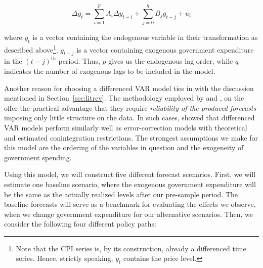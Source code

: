 \begin{equation}
\Delta y_{t}= \sum^{p}_{i = 1}A_{i}\Delta y_{t-i} + \sum^{q}_{j=0}B_{j}g_{t-j} + u_{t}
\end{equation}

where $y_{t}$ is a vector containing the endogenous variable in their transformation as described above\footnote{Note that the CPI series is, by its construction, already a differenced time series. Hence, strictly speaking,  $y_{t}$ contains the price level.}, $g_{t-j}$ is a vector containing exogenous government expenditure in the $(t-j)^{\text{th}}$ period. Thus, $p$ gives us the endogenous lag order, while $q$ indicates the number of exogenous lags to be included in the model. 

Another reason for choosing a differenced VAR model ties in with the discussion mentioned in Section~\ref{sec:litrev}. The methodology employed by \citeauthor{lenza2010} and \citeauthor{kapetanios2012}, on the offer the practical advantage that they require \emph{reliability of the produced forecasts} imposing only little structure on the data. In such cases, \citeauthor{duy1998modeling} showed that differenced VAR models perform similarly well as error-correction models with theoretical and estimated conintegration restrictions. The strongest assumptions we make for this model are the ordering of the variables in question and the exogeneity of government spending.

Using this model, we will construct five different forecast scenarios. First, we will estimate one baseline scenario, where the exogenous government expenditure will be the same as the actually realized levels after our pre-sample period. The baseline forecasts will serve as a benchmark for evaluating the effects we observe, when we change government expenditure for our alternative scenarios. Then, we consider the following four different policy paths:

